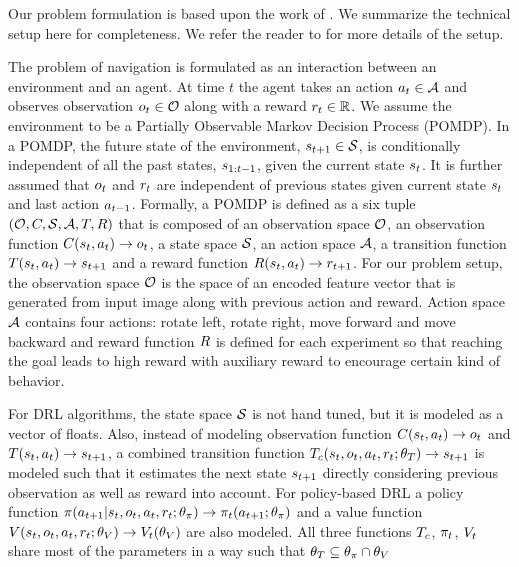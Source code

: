 Our problem formulation is based upon the work of \cite{MiPaViICLR2017}. We summarize the technical setup here for completeness.
We refer the reader to \cite{MnBaMiICML2016,MiPaViICLR2017} for more details of the setup.

The problem of navigation is formulated as an interaction between an environment and an agent.
At time $t$ the agent takes an action $a_t \in \mathcal{A}$ and observes observation $o_t \in \mathcal{O}$ along with a reward $r_t \in \mathbb{R}$.
We assume the environment to be a Partially Observable Markov Decision Process (POMDP).
In a POMDP, the future state of the environment, $s_{t+1} \in \mathcal{S}$, is conditionally independent of all the past states, $s_{1:t-1}$, given the current state $s_t$. It is further assumed that
$o_t$ and $r_t$ are independent of previous states given current state $s_t$ and last action $a_{t-1}$.
Formally, a POMDP is defined as a six tuple $(\mathcal{O}, C, \mathcal{S}, \mathcal{A}, T, R)$ that is composed of an observation space $\mathcal{O}$, an observation function $C(s_t, a_t) \rightarrow o_t$, a state space $\mathcal{S}$, an action space $\mathcal{A}$, a transition function $T(s_t, a_t) \rightarrow s_{t+1}$ and a reward function $R(s_t, a_t) \rightarrow r_{t+1}$.
For our problem setup, the observation space $\mathcal{O}$ is the space of an encoded feature vector that is generated from input image along with previous action and reward.
Action space $\mathcal{A}$ contains four actions: rotate left, rotate right, move forward and move backward and reward function $R$ is defined for each experiment so that reaching the goal leads to high reward with auxiliary reward to encourage certain kind of behavior.

For DRL algorithms, the state space $\mathcal{S}$ is not hand tuned, but it is modeled as a vector of floats.
Also, instead of modeling observation function $C(s_t, a_t) \rightarrow o_t$ and $T(s_t, a_t) \rightarrow s_{t+1}$, a combined transition function $T_c(s_t, o_t, a_t, r_t; \theta_T) \rightarrow s_{t+1}$ is modeled such that it estimates the next state $s_{t+1}$ directly considering previous observation as well as reward into account.
For policy-based DRL a policy function $\pi(a_{t+1}|s_t, o_t, a_t, r_t; \theta_\pi) \rightarrow \pi_t(a_{t+1} ; \theta_\pi)$ and a value function $V(s_t, o_t, a_t, r_t; \theta_V) \rightarrow V_t(\theta_V)$ are also modeled.
All three functions $T_c$, $\pi_t$, $V_t$ share most of the parameters in a way such that $\theta_T \subseteq \theta_{\pi} \cap \theta_V$

